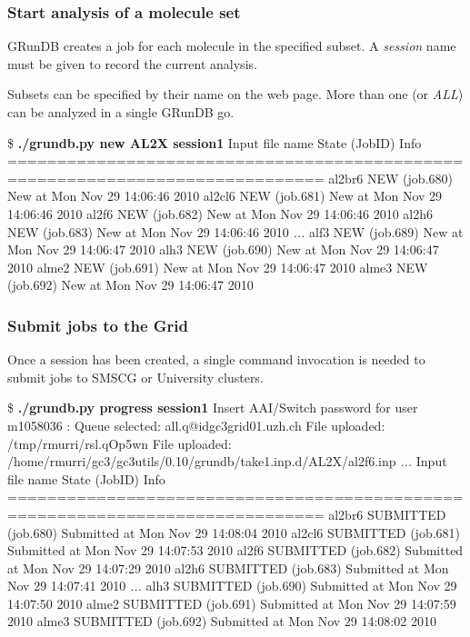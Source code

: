 \documentclass {beamer}
\newcommand{\largeskip}{\vspace{1em}}
\def\+{\largeskip}
\begin{document}
\begin{frame}[fragile]
  \frametitle{Start analysis of a molecule set}

  GRunDB creates a job for each molecule in the specified subset.
  A \emph{session} name must be given to record the current analysis.

  \+ 
  Subsets can be specified by their name on the web page.  More
  than one (or \emph{ALL}) can be analyzed in a single GRunDB go.

  \+
  \begin{footnotesize}
\begin{semiverbatim}
\$ {\bf ./grundb.py new AL2X session1}
Input file name  State (JobID)       Info
==============================================================================
al2br6           NEW (job.680)       New at Mon Nov 29 14:06:46 2010
al2cl6           NEW (job.681)       New at Mon Nov 29 14:06:46 2010
al2f6            NEW (job.682)       New at Mon Nov 29 14:06:46 2010
al2h6            NEW (job.683)       New at Mon Nov 29 14:06:46 2010
{\em ...}
alf3             NEW (job.689)       New at Mon Nov 29 14:06:47 2010
alh3             NEW (job.690)       New at Mon Nov 29 14:06:47 2010
alme2            NEW (job.691)       New at Mon Nov 29 14:06:47 2010
alme3            NEW (job.692)       New at Mon Nov 29 14:06:47 2010
\end{semiverbatim}    
  \end{footnotesize}
\end{frame}

\begin{frame}[fragile]
  \frametitle{Submit jobs to the Grid}

  Once a session has been created, a single command invocation is
  needed to submit jobs to SMSCG or University clusters.
  \+
  \begin{footnotesize}
\begin{semiverbatim}
\$ {\bf ./grundb.py progress session1}
Insert AAI/Switch password for user  m1058036 :
Queue selected: all.q@idgc3grid01.uzh.ch
File uploaded: /tmp/rmurri/rsl.qOp5wn
File uploaded: /home/rmurri/gc3/gc3utils/0.10/grundb/take1.inp.d/AL2X/al2f6.inp
  {\em ...}
Input file name  State (JobID)       Info
==============================================================================
al2br6           SUBMITTED (job.680)  Submitted at Mon Nov 29 14:08:04 2010
al2cl6           SUBMITTED (job.681)  Submitted at Mon Nov 29 14:07:53 2010
al2f6            SUBMITTED (job.682)  Submitted at Mon Nov 29 14:07:29 2010
al2h6            SUBMITTED (job.683)  Submitted at Mon Nov 29 14:07:41 2010
  {\em ...}
alh3             SUBMITTED (job.690)  Submitted at Mon Nov 29 14:07:50 2010
alme2            SUBMITTED (job.691)  Submitted at Mon Nov 29 14:07:59 2010
alme3            SUBMITTED (job.692)  Submitted at Mon Nov 29 14:08:02 2010
\end{semiverbatim}    
  \end{footnotesize}
\end{frame}
\end{document}
